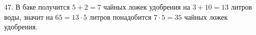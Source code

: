 47. В баке получится $5+2=7$ чайных ложек удобрения на $3+10=13$ литров воды, значит на $65=13\cdot5$ литров понадобится $7\cdot5=35$ чайных ложек удобрения.\\
